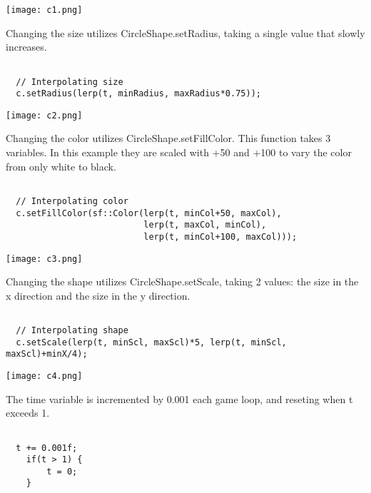 \documentclass[11pt]{amsart}
\begin{document}
\begin{center}
\texttt{[image: c1.png]}
\end{center}

Changing the size utilizes CircleShape.setRadius, taking a single value that slowly increases. \\

\begin{verbatim}

  // Interpolating size
  c.setRadius(lerp(t, minRadius, maxRadius*0.75));

\end{verbatim}

\begin{center}
\texttt{[image: c2.png]}
\end{center}

Changing the color utilizes CircleShape.setFillColor. This function takes 3 variables.
In this example they are scaled with +50 and +100 to vary the color from only white to black. \\

\begin{verbatim}

  // Interpolating color
  c.setFillColor(sf::Color(lerp(t, minCol+50, maxCol),
                           lerp(t, maxCol, minCol),
                           lerp(t, minCol+100, maxCol)));

\end{verbatim}

\begin{center}
\texttt{[image: c3.png]}
\end{center}

Changing the shape utilizes CircleShape.setScale, taking 2 values: the size in the x direction and the size in the y direction. \\

\begin{verbatim}

  // Interpolating shape
  c.setScale(lerp(t, minScl, maxScl)*5, lerp(t, minScl, maxScl)+minX/4);

\end{verbatim}

\begin{center}
\texttt{[image: c4.png]}
\end{center}

The time variable is incremented by 0.001 each game loop, and reseting when t exceeds 1. \\
\begin{verbatim}

  t += 0.001f;
    if(t > 1) {
        t = 0;
    }

\end{verbatim}
\end{document}
